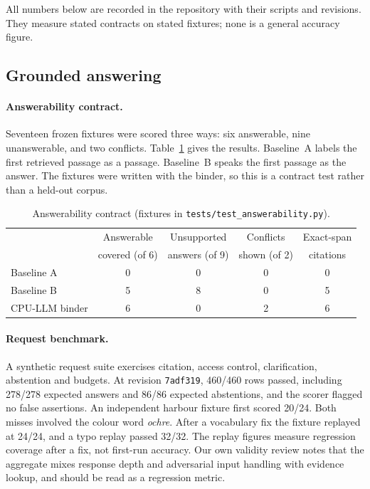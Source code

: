 \documentclass[11pt]{article}
\begin{document}
All numbers below are recorded in the repository with their scripts and revisions. They measure stated contracts
on stated fixtures; none is a general accuracy figure.

\subsection{Grounded answering}

\paragraph{Answerability contract.} Seventeen frozen fixtures were scored three ways: six answerable, nine
unanswerable, and two conflicts. Table~\ref{tab:answer} gives the results. Baseline~A labels the first retrieved
passage as a passage. Baseline~B speaks the first passage as the answer. The fixtures were written with the binder,
so this is a contract test rather than a held-out corpus.

\begin{table}[h]
\centering\footnotesize
\begin{tabular}{lcccc}
\toprule
 & Answerable & Unsupported & Conflicts & Exact-span\\
 & covered (of 6) & answers (of 9) & shown (of 2) & citations\\
\midrule
Baseline A & 0 & 0 & 0 & 0\\
Baseline B & 5 & 8 & 0 & 5\\
CPU-LLM binder & 6 & 0 & 2 & 6\\
\bottomrule
\end{tabular}
\caption{Answerability contract (fixtures in \texttt{tests/test\_answerability.py}).}
\label{tab:answer}
\end{table}

\paragraph{Request benchmark.} A synthetic request suite exercises citation, access control, clarification,
abstention and budgets. At revision \texttt{7adf319}, 460/460 rows passed, including 278/278 expected answers and
86/86 expected abstentions, and the scorer flagged no false assertions. An independent harbour fixture first
scored 20/24. Both misses involved the colour word \emph{ochre}. After a vocabulary fix the fixture replayed at
24/24, and a typo replay passed 32/32. The replay figures measure regression coverage after a fix, not first-run
accuracy. Our own validity review notes that the aggregate mixes response depth and adversarial input handling
with evidence lookup, and should be read as a regression metric.
\end{document}
